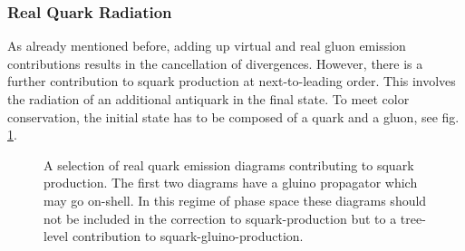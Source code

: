 \subsubsection{Real Quark Radiation}\label{sec:RealQuarkRad}
As already mentioned before, adding up virtual and real gluon emission contributions results in the cancellation of divergences. However, there is a further contribution to squark production at next-to-leading order. This involves the radiation of an additional antiquark in the final state. To meet color conservation, the initial state has to be composed of a quark and a gluon, see fig. \ref{fig:quarkradiation}.
\begin{figure}[!htbp]
\begin{center}
\caption{A selection of real quark emission diagrams contributing to squark production. The first two diagrams have a gluino propagator which may go on-shell. In this regime of phase space these diagrams should not be included in the correction to squark-production but to a tree-level contribution to squark-gluino-production.}\label{fig:quarkradiation}
\end{center}
\end{figure}
